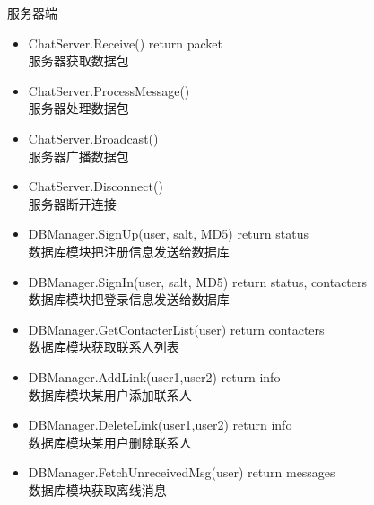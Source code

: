 服务器端
\begin{itemize}
	\item ChatServer.Receive() return packet \\
	服务器获取数据包
	\item ChatServer.ProcessMessage()\\
	服务器处理数据包
	\item ChatServer.Broadcast()\\
	服务器广播数据包
	\item ChatServer.Disconnect()\\
	服务器断开连接
    \item DBManager.SignUp(user, salt, MD5) return status \\
    数据库模块把注册信息发送给数据库 
    \item DBManager.SignIn(user, salt, MD5) return status, contacters\\
    数据库模块把登录信息发送给数据库
    \item DBManager.GetContacterList(user) return contacters\\
    数据库模块获取联系人列表
    \item DBManager.AddLink(user1,user2) return info\\
    数据库模块某用户添加联系人
    \item DBManager.DeleteLink(user1,user2) return info\\
	数据库模块某用户删除联系人
	\item DBManager.FetchUnreceivedMsg(user) return messages\\
	数据库模块获取离线消息    
\end{itemize}
